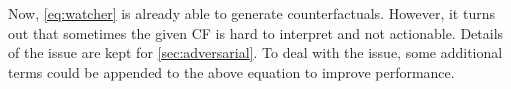 Now, \autoref{eq:watcher} is already able to generate counterfactuals. However, it turns out that sometimes the given CF is hard to interpret and not actionable. Details of the issue are kept for \autoref{sec:adversarial}. To deal with the issue, some additional terms could be appended to the above equation to improve performance.
